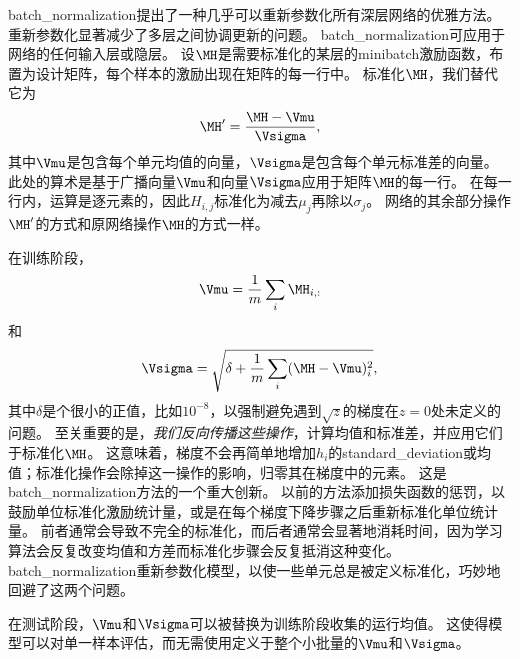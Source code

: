 
\gls{batch_normalization}提出了一种几乎可以重新参数化所有深层网络的优雅方法。
重新参数化显著减少了多层之间协调更新的问题。
\gls{batch_normalization}可应用于网络的任何输入层或隐层。
设$\MH$是需要标准化的某层的\gls{minibatch}激励函数，布置为设计矩阵，每个样本的激励出现在矩阵的每一行中。
标准化$\MH$，我们替代它为
\begin{equation}
\MH' = \frac{\MH - \Vmu}{\Vsigma},
\end{equation}
其中$\Vmu$是包含每个单元均值的向量，$\Vsigma$是包含每个单元标准差的向量。
此处的算术是基于广播向量$\Vmu$和向量$\Vsigma$应用于矩阵$\MH$的每一行。
在每一行内，运算是逐元素的，因此$H_{i,j}$标准化为减去$\mu_j$再除以$\sigma_j$。
网络的其余部分操作$\MH'$的方式和原网络操作$\MH$的方式一样。

在训练阶段，
\begin{equation}
    \Vmu = \frac{1}{m} \sum_i \MH_{i,:}
\end{equation}
和
\begin{equation}
    \Vsigma = \sqrt{ \delta + \frac{1}{m} \sum_i (\MH - \Vmu)_i^2 },
\end{equation}
其中$\delta$是个很小的正值，比如$10^{-8}$，以强制避免遇到$\sqrt{z}$的梯度在$z=0$处未定义的问题。
至关重要的是，\emph{我们反向传播这些操作}，计算均值和标准差，并应用它们于标准化$\MH$。
这意味着，梯度不会再简单地增加$h_i$的\gls{standard_deviation}或均值；标准化操作会除掉这一操作的影响，归零其在梯度中的元素。
这是\gls{batch_normalization}方法的一个重大创新。
以前的方法添加损失函数的惩罚，以鼓励单位标准化激励统计量，或是在每个梯度下降步骤之后重新标准化单位统计量。
前者通常会导致不完全的标准化，而后者通常会显著地消耗时间，因为学习算法会反复改变均值和方差而标准化步骤会反复抵消这种变化。
\gls{batch_normalization}重新参数化模型，以使一些单元总是被定义标准化，巧妙地回避了这两个问题。


在测试阶段，$\Vmu$和$\Vsigma$可以被替换为训练阶段收集的运行均值。
这使得模型可以对单一样本评估，而无需使用定义于整个小批量的$\Vmu$和$\Vsigma$。

